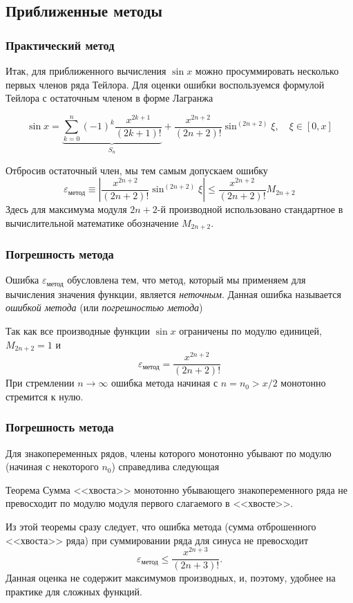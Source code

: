 \documentclass[aspectratio=43,unicode]{beamer}
\begin{document}
\subsection{Приближенные методы}
\begin{frame}
\frametitle{Практический метод}
	Итак, для приближенного вычисления $\sin x$ можно просуммировать
	несколько первых членов ряда Тейлора. Для оценки ошибки воспользуемся
	формулой Тейлора с остаточным членом в форме Лагранжа

	\[
	\sin x = \underbrace{\sum_{k=0}^{n} (-1)^k \frac{x^{2k+1}}{(2k+1)!}}_{S_n} +
	\frac{x^{2n+2}}{(2n+2)!}\sin^{(2n+2)} \xi,
	\quad \xi \in [0, x]
	\]

	\pause

	Отбросив остаточный член, мы тем самым допускаем ошибку
	\[
	\varepsilon_{\text{метод}}\equiv
	\left|\frac{x^{2n+2}}{(2n+2)!}\sin^{(2n+2)} \xi \right| \leqslant
	\frac{x^{2n+2}}{(2n+2)!}M_{2n+2}
	\]
	Здесь для максимума модуля $2n+2$-й производной использовано стандартное в
	вычислительной математике обозначение $M_{2n+2}$.
\end{frame}

\begin{frame}
\frametitle{Погрешность метода}
	Ошибка $\varepsilon_{\text{метод}}$ обусловлена тем, что метод, который мы
	применяем для вычисления значения функции, является \emph{неточным}.
	Данная ошибка называется \emph{ошибкой метода} (или \emph{погрешностью метода})

	\pause

	Так как все производные функции $\sin x$ ограничены по модулю единицей, $M_{2n+2} = 1$ и
	\[
	\varepsilon_{\text{метод}} = \frac{x^{2n+2}}{(2n+2)!}
	\]
	При стремлении $n \rightarrow \infty$ ошибка метода начиная с $n = n_0 >
	x/2$ монотонно стремится к нулю.
\end{frame}

\begin{frame}
\frametitle{Погрешность метода}
	Для знакопеременных рядов, члены которого монотонно убывают по модулю
	(начиная с некоторого $n_0$) справедлива следующая
	\begin{block}{Теорема}
	Сумма <<хвоста>> монотонно убывающего знакопеременного ряда не
	превосходит по модулю модуля первого слагаемого в <<хвосте>>.
	\end{block}

	Из этой теоремы сразу следует, что ошибка метода (сумма отброшенного
	<<хвоста>> ряда) при суммировании ряда для
	синуса не превосходит
	\[
		\varepsilon_\text{метод} \leq \frac{x^{2n+3}}{(2n+3)!}.
	\]
	Данная оценка не содержит максимумов производных, и, поэтому, удобнее на
	практике для сложных функций.
\end{frame}
\end{document}
